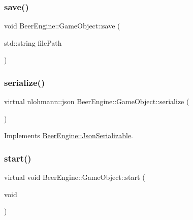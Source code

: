 \subsubsection{\texorpdfstring{save()}{save()}}
{\footnotesize\ttfamily void Beer\+Engine\+::\+Game\+Object\+::save (\begin{DoxyParamCaption}\item[{std\+::string}]{file\+Path }\end{DoxyParamCaption})}

\mbox{\label{class_beer_engine_1_1_game_object_a4b1436f051194c385b9a82ad8fbb0c5b}} 
\subsubsection{\texorpdfstring{serialize()}{serialize()}}
{\footnotesize\ttfamily virtual nlohmann\+::json Beer\+Engine\+::\+Game\+Object\+::serialize (\begin{DoxyParamCaption}{ }\end{DoxyParamCaption})\hspace{0.3cm}{\ttfamily [virtual]}}



Implements \mbox{\hyperlink{class_beer_engine_1_1_json_serializable_a17689cbd8fe282c570bd026cc1be5b3b}{Beer\+Engine\+::\+Json\+Serializable}}.

\mbox{\label{class_beer_engine_1_1_game_object_a2caa6e6105c6766fdac3688ff1e74f00}} 
\subsubsection{\texorpdfstring{start()}{start()}}
{\footnotesize\ttfamily virtual void Beer\+Engine\+::\+Game\+Object\+::start (\begin{DoxyParamCaption}\item[{void}]{ }\end{DoxyParamCaption})\hspace{0.3cm}{\ttfamily [virtual]}}



